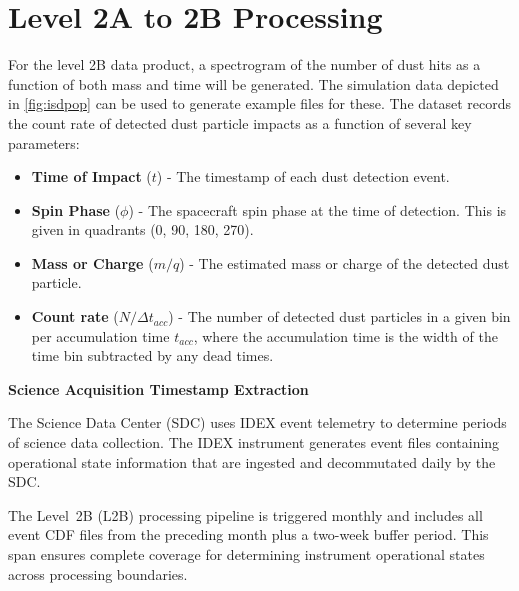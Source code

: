 



\section{Level 2A to 2B Processing}
For the level 2B  data product, a spectrogram of the number of dust hits as a function of both mass and time will be generated. The simulation data depicted in \autoref{fig:isdpop} can be used to generate example files for these. The dataset records the count rate of detected dust particle impacts as a function of several key parameters: 


\begin{itemize}
    \item \textbf{Time of Impact} ($t$) - The timestamp of each dust detection event.
    \item \textbf{Spin Phase} ($\phi$) - The spacecraft spin phase at the time of detection. This is given in quadrants (0, 90, 180, 270).
    \item \textbf{Mass or Charge} ($m/q$) - The estimated mass or charge of the detected dust particle.
    \item \textbf{Count rate} ($N/\Delta t_{acc}$) - The number of detected dust particles in a given bin per accumulation time $t_{acc}$, where the accumulation time is the width of the time bin subtracted by any dead times.
\end{itemize}

\noindent\textbf{Science Acquisition Timestamp Extraction}

The Science Data Center (SDC) uses IDEX event telemetry to determine periods of science data collection. The IDEX instrument generates event files containing operational state information that are ingested and decommutated daily by the SDC.

The Level~2B (L2B) processing pipeline is triggered monthly and includes all event CDF files from the preceding month plus a two-week buffer period. This span ensures complete coverage for determining instrument operational states across processing boundaries.

